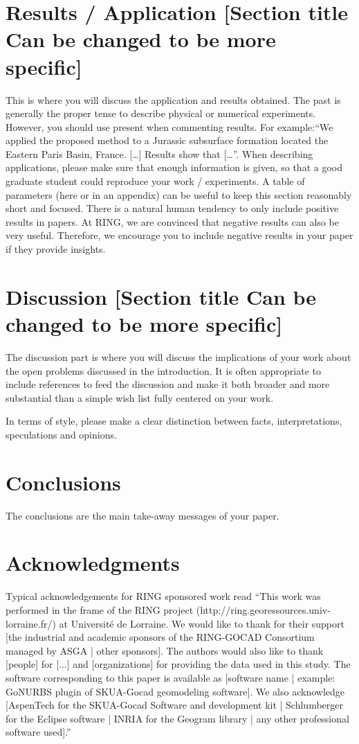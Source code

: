 \documentclass[final]{ring}
\begin{document}
\section{Results / Application [Section title Can be changed to be more specific]}
\label{sec:appli}

This is where you will discuss the application and results obtained. The past is generally the proper tense to describe physical or numerical experiments. However, you should use present when commenting results. For example:``We applied the proposed method to a Jurassic subsurface formation located the Eastern Paris Basin, France. […] Results show that […''.
When describing applications, please make sure that enough information is given, so that a good graduate student could reproduce your work / experiments. A table of parameters (here or in an appendix) can be useful to keep this section reasonably short and focused.
There is a natural human tendency to only include positive results in papers. At RING, we are convinced that negative results can also be very useful. Therefore, we encourage you to include negative results in your paper if they provide insights. 


\section{Discussion [Section title Can be changed to be more specific]}
\label{sec:discussion}

The discussion part is where you will discuss the implications of your work about the open problems discussed in the introduction. It is often appropriate to include references to feed the discussion and make it both broader and more substantial than a simple wish list fully centered on your work. 

In terms of style, please make a clear distinction between facts, interpretations, speculations and opinions. 

\section*{Conclusions}

The conclusions are the main take-away messages of your paper. 

\section*{Acknowledgments}

Typical acknowledgements for RING sponsored work read ``This work was performed
in the frame of the RING project (http://ring.georessources.univ-lorraine.fr/)
at Université de Lorraine. We would like to thank for their support [the
industrial and academic sponsors of the RING-GOCAD Consortium managed by ASGA |
other sponsors]. The authors would also like to thank [people] for [...] and
[organizations] for providing the data used in this study. The software
corresponding to this paper is available as [software name | example: GoNURBS
plugin of SKUA-Gocad geomodeling software]. We also acknowledge [AspenTech for the SKUA-Gocad Software and development kit | Schlumberger for the Eclipse software | INRIA for the Geogram library | any other professional software used].''


\end{document}
